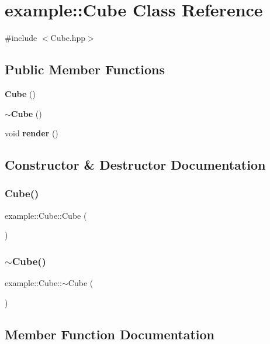 \section{example\+::Cube Class Reference}
\label{classexample_1_1_cube}


{\ttfamily \#include $<$Cube.\+hpp$>$}

\subsection*{Public Member Functions}
\begin{DoxyCompactItemize}
\item 
\textbf{ Cube} ()
\item 
\textbf{ $\sim$\+Cube} ()
\item 
void \textbf{ render} ()
\end{DoxyCompactItemize}


\subsection{Constructor \& Destructor Documentation}
\mbox{\label{classexample_1_1_cube_a3be7fbbad6d33b8ca68487fea7e20bdf}} 
\subsubsection{Cube()}
{\footnotesize\ttfamily example\+::\+Cube\+::\+Cube (\begin{DoxyParamCaption}{ }\end{DoxyParamCaption})}

\mbox{\label{classexample_1_1_cube_ab82f621c8aeb1ce7ccd72afd605d6b7a}} 
\subsubsection{$\sim$Cube()}
{\footnotesize\ttfamily example\+::\+Cube\+::$\sim$\+Cube (\begin{DoxyParamCaption}{ }\end{DoxyParamCaption})}



\subsection{Member Function Documentation}
\mbox{\label{classexample_1_1_cube_a9f968872ab6a7ee0362e49a0c5f4e8b6}} 
